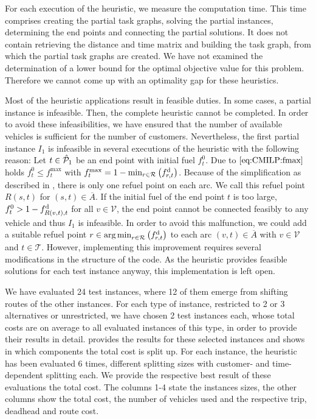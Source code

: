 For each execution of the heuristic, we measure the computation time. This time comprises creating the partial task graphs, solving the partial instances, determining the end points and connecting the partial solutions. It does not contain retrieving the distance and time matrix and building the task graph, from which the partial task graphs are created. We have not examined the determination of a lower bound for the optimal objective value for this problem. Therefore we cannot come up with an optimality gap for these heuristics.

Most of the heuristic applications result in feasible duties. In some cases, a partial instance is infeasible. Then, the complete heuristic cannot be completed. In order to avoid these infeasibilities, we have ensured that the number of available vehicles is sufficient for the number of customers. Nevertheless, the first partial instance $I_1$ is infeasible in several executions of the heuristic with the following reason: Let $t\in\hat{\mathcal{P}}_1$ be an end point with initial fuel $f^0_t$. Due to $\eqref{eq:CMILP:fmax}$ holds ${f^0_t\leq f^{\max}_t}$ with ${f^{\max}_t = 1 - \min_{r\in\mathcal{R}}\left(f^{\operatorname{d}}_{r,t}\right)}$. Because of the simplification as described in , there is only one refuel point on each arc. We call this refuel point $R(s,t)$ for ${(s,t)\in\overline{A}}$. If the initial fuel of the end point $t$ is too large, \ie ${f^0_t > 1 - f^{\operatorname{d}}_{R(v,t),t}}$ for all ${v\in\mathcal{V}}$, the end point cannot be connected feasibly to any vehicle and thus $I_1$ is infeasible. In order to avoid this malfunction, we could add a suitable refuel point ${r\in\operatorname*{arg\,min}_{r\in\mathcal{R}}\left(f^{\operatorname{d}}_{r,t}\right)}$ to each arc ${(v,t)\in\overline{A}}$ with ${v\in\mathcal{V}}$ and ${t\in\mathcal{T}}$. However, implementing this improvement requires several modifications in the structure of the code. As the heuristic provides feasible solutions for each test instance anyway, this implementation is left open.

We have evaluated 24 test instances, where 12 of them emerge from shifting routes of the other instances. For each type of instance, \ie restricted to 2 or 3 alternatives or unrestricted, we have chosen 2 test instances each, whose total costs are on average to all evaluated instances of this type, in order to provide their results in detail.  provides the results for these selected instances and shows in which components the total cost is split up. For each instance, the heuristic has been evaluated 6 times,  different splitting sizes with customer- and time-dependent splitting each. We provide the respective best result of these evaluations \wrt the total cost. The columns 1-4 state the instances sizes, the other columns show the total cost, the number of vehicles used and the respective trip, deadhead and route cost.

